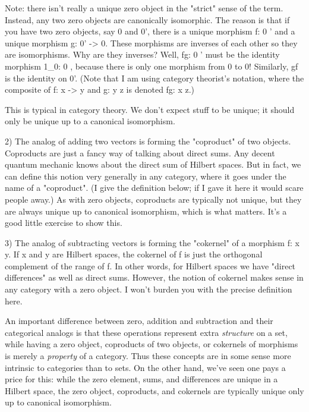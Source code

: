 Note: there isn't really a unique zero object in the "strict"
sense of the term.  Instead, any two zero objects are canonically
isomorphic.  The reason is that if you have two zero objects, say 0 and
0', there is a unique morphism f: 0 ' and a unique morphism g: 0'
-> 0.  These morphisms are inverses of each other so they are
isomorphisms.  Why are they inverses?  Well, fg: 0 ' must be the
identity morphism 1_{0}: 0 , because there is only one
morphism from 0 to 0!  Similarly, gf is the identity on 0'.  (Note that
I am using category theorist's notation, where the composite of f: x
-> y and g: y \to  z is denoted fg: x \to  z.)

This is typical in category theory.  We don't expect stuff to be
unique; it should only be unique up to a canonical isomorphism.

2) The analog of adding two vectors is forming the "coproduct" of two
objects.  Coproducts are just a fancy way of talking about direct
sums.  Any decent quantum mechanic knows about the direct sum of
Hilbert spaces.  But in fact, we can define this notion very generally
in any category, where it goes under the name of a "coproduct".  (I
give the definition below; if I gave it here it would scare people
away.)  As with zero objects, coproducts are typically not unique, but
they are always unique up to canonical isomorphism, which is what
matters.  It's a good little exercise to show this.

3) The analog of subtracting vectors is forming the "cokernel" of a
morphism f: x \to  y.  If x and y are Hilbert spaces, the cokernel of f
is just the orthogonal complement of the range of f.  In other words,
for Hilbert spaces we have "direct differences" as well as direct
sums.  However, the notion of cokernel makes sense in any category
with a zero object.  I won't burden you with the precise definition
here.

An important difference between zero, addition and subtraction and
their categorical analogs is that these operations represent extra
\emph{structure} on a set, while having a zero object, coproducts of two
objects, or cokernels of morphisms is merely a \emph{property} of a
category.  Thus these concepts are in some sense more intrinsic to
categories than to sets.  On the other hand, we've seen one pays a
price for this: while the zero element, sums, and differences are
unique in a Hilbert space, the zero object, coproducts, and cokernels
are typically unique only up to canonical isomorphism.

